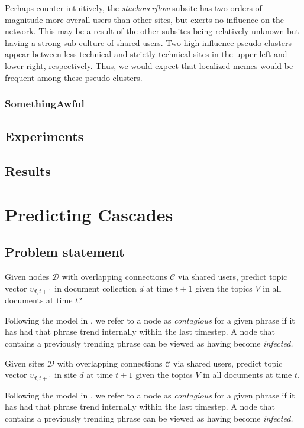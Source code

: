 \documentclass{article} %
\begin{document}
Perhaps counter-intuitively, the \textit{stackoverflow} subsite has two orders of magnitude more overall users than other sites, but exerts no influence on the network. This may be a result of the other subsites being relatively unknown but having a strong sub-culture of shared users. Two high-influence pseudo-clusters appear between less technical and strictly technical sites in the upper-left and lower-right, respectively. Thus, we would expect that localized memes would be frequent among these pseudo-clusters.

\subsubsection{SomethingAwful}

\subsection{Experiments}
\label{experiments}

\subsection{Results}
\label{results}

\section{Predicting Cascades}

\subsection{Problem statement}
Given nodes $\mathcal{D}$ with overlapping connections $\mathcal{C}$ via shared users, predict topic vector $v_{d,t+1}$ in document collection $d$ at time $t+1$ given the topics $V$ in all documents at time $t$?


Following the model in \cite{influential}, we refer to a node as \textit{contagious} for a given phrase if it has had that phrase trend internally within the last timestep. A node that contains a previously trending phrase can be viewed as having become \textit{infected.} 

Given sites $\mathcal{D}$ with overlapping connections $\mathcal{C}$ via shared users, predict topic vector $v_{d,t+1}$ in site $d$ at time $t+1$ given the topics $V$ in all documents at time $t$.

Following the model in \cite{influential}, we refer to a node as \textit{contagious} for a given phrase if it has had that phrase trend internally within the last timestep. A node that contains a previously trending phrase can be viewed as having become \textit{infected.} 
\end{document}
